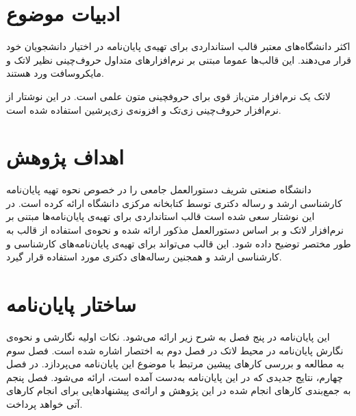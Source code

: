 \section{ادبیات موضوع}

اکثر دانشگاه‌های معتبر قالب استانداردی برای تهیه‌ی پایان‌نامه در اختیار دانشجویان خود قرار می‌دهند.
این قالب‌ها عموما مبتنی بر نرم‌افزارهای متداول حروف‌چینی نظیر لاتک و مایکروسافت ورد هستند.

 لاتک
 \LTRfootnote{\LaTeX}
  یک نرم‌افزار متن‌باز قوی برای حروفچینی متون علمی است.\cite
 {knuth1984texbook, lamport1985LaTeX}
در این نوشتار از نرم‌افزار حروف‌چینی زی‌تک
\LTRfootnote{\XeTeX}
 و افزونه‌ی زی‌پرشین
 \LTRfootnote{\XePersian}
 استفاده شده است.


\section{اهداف پژوهش}

دانشگاه صنعتی شریف دستورالعمل جامعی را در خصوص
نحوه تهیه پایان‌نامه کارشناسی ارشد و رساله دکتری توسط کتابخانه مرکزی دانشگاه ارائه کرده است.
در این نوشتار سعی شده است قالب استانداردی برای تهیه‌ی پایان‌نامه‌ها مبتنی بر نرم‌افزار لاتک و
بر اساس دستورالعمل مذکور ارائه شده و
نحوه‌ی استفاده از قالب به طور مختصر توضیح داده شود.
این قالب  می‌تواند برای تهیه‌ی پایان‌نامه‌های کارشناسی و کارشناسی ارشد
و همجنین رساله‌ها‌ی دکتری مورد استفاده قرار گیرد.

\section{ساختار پایان‌نامه}

این پایان‌نامه در پنج فصل به شرح زیر ارائه می‌شود.
نکات اولیه نگارشی و نحوه‌ی نگارش پایان‌نامه در محیط لاتک در  فصل دوم به اختصار اشاره شده است.
فصل سوم به مطالعه و بررسی کارهای پیشین مرتبط با موضوع این پایان‌نامه می‌پردازد.
در فصل چهارم، نتایج جدیدی که در این پایان‌نامه به‌دست آمده است، ارائه می‌شود.
فصل پنجم به جمع‌بندی کارهای انجام شده در این پژوهش و ارائه‌ی پیشنهادهایی برای انجام کارهای آتی خواهد پرداخت.